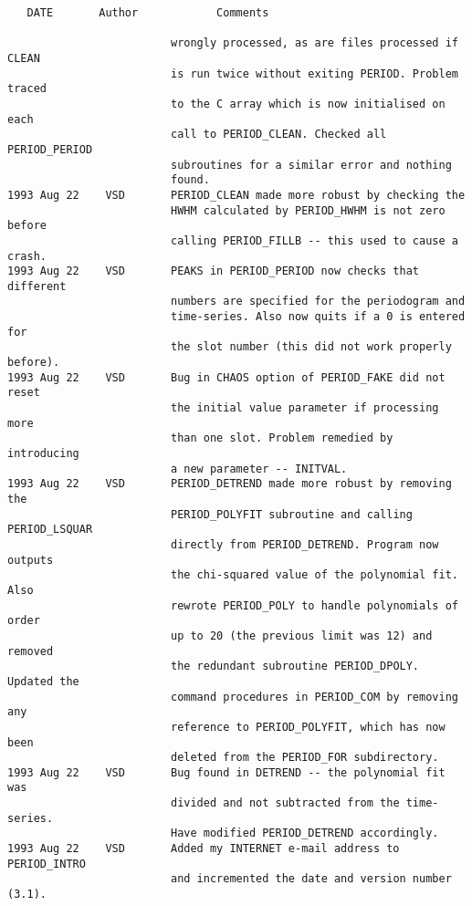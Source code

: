 \begin{verbatim}
\end{verbatim}


\newpage


\begin{verbatim}
   DATE       Author            Comments                           
	                   
                         wrongly processed, as are files processed if CLEAN
                         is run twice without exiting PERIOD. Problem traced
                         to the C array which is now initialised on each
                         call to PERIOD_CLEAN. Checked all PERIOD_PERIOD 
                         subroutines for a similar error and nothing 
                         found.
1993 Aug 22    VSD       PERIOD_CLEAN made more robust by checking the
                         HWHM calculated by PERIOD_HWHM is not zero before
                         calling PERIOD_FILLB -- this used to cause a crash.
1993 Aug 22    VSD       PEAKS in PERIOD_PERIOD now checks that different 
                         numbers are specified for the periodogram and 
                         time-series. Also now quits if a 0 is entered for
                         the slot number (this did not work properly before).
1993 Aug 22    VSD       Bug in CHAOS option of PERIOD_FAKE did not reset
                         the initial value parameter if processing more
                         than one slot. Problem remedied by introducing
                         a new parameter -- INITVAL. 
1993 Aug 22    VSD       PERIOD_DETREND made more robust by removing the
                         PERIOD_POLYFIT subroutine and calling PERIOD_LSQUAR
                         directly from PERIOD_DETREND. Program now outputs
                         the chi-squared value of the polynomial fit. Also
                         rewrote PERIOD_POLY to handle polynomials of order
                         up to 20 (the previous limit was 12) and removed
                         the redundant subroutine PERIOD_DPOLY. Updated the
                         command procedures in PERIOD_COM by removing any
                         reference to PERIOD_POLYFIT, which has now been 
                         deleted from the PERIOD_FOR subdirectory.
1993 Aug 22    VSD       Bug found in DETREND -- the polynomial fit was
                         divided and not subtracted from the time-series.
                         Have modified PERIOD_DETREND accordingly.
1993 Aug 22    VSD       Added my INTERNET e-mail address to PERIOD_INTRO
                         and incremented the date and version number (3.1).

\end{verbatim}
